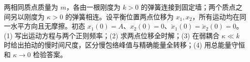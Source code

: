 两相同质点质量为 \(m\)，各由一根刚度为 \(k>0\) 的弹簧连接到固定墙；两个质点之间另以刚度为 \(\kappa>0\) 的弹簧相连。设平衡位置两点位移为 \(x_1,x_2\)，所有运动均在同一水平方向且无摩擦。初态 \(x_1(0)=A\)、\(x_2(0)=0\)、\(\dot x_1(0)=\dot x_2(0)=0\)。
(1) 写出运动方程与两个正则频率；(2) 求两点位移全时解；(3) 在弱耦合 \(\kappa\ll k\) 时给出拍动的慢时间尺度，区分慢包络峰值与精确能量全转移；(4) 用总能量守恒和 \(\kappa\to0\) 检验答案。
